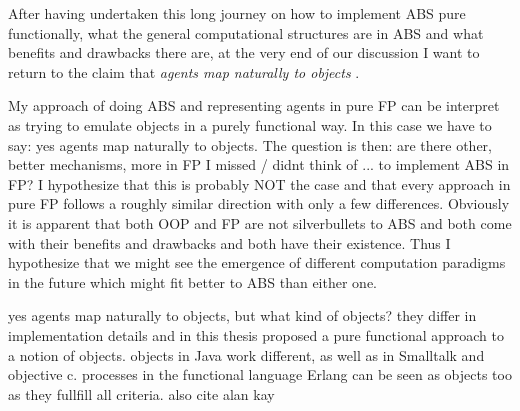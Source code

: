 \medskip

After having undertaken this long journey on how to implement ABS pure functionally, what the general computational structures are in ABS and what benefits and drawbacks there are, at the very end of our discussion I want to return to the claim that \textit{agents map naturally to objects} \cite{north_managing_2007}.

My approach of doing ABS and representing agents in pure FP can be interpret as trying to emulate objects in a purely functional way. In this case we have to say: yes agents map naturally to objects. The question is then: are there other, better mechanisms, more in FP I missed / didnt think of ... to implement ABS in FP? I hypothesize that this is probably NOT the case and that every approach in pure FP follows a roughly similar direction with only a few differences. Obviously it is apparent that both OOP and FP are not silverbullets to ABS and both come with their benefits and drawbacks and both have their existence. Thus I hypothesize that we might see the emergence of different computation paradigms in the future which might fit better to ABS than either one.

yes agents map naturally to objects, but what kind of objects? they differ in implementation details and in this thesis proposed a pure functional approach to a notion of objects. objects in Java work different, as well as in Smalltalk and objective c. processes in the functional language Erlang can be seen as objects too as they fullfill all criteria. also cite alan kay

